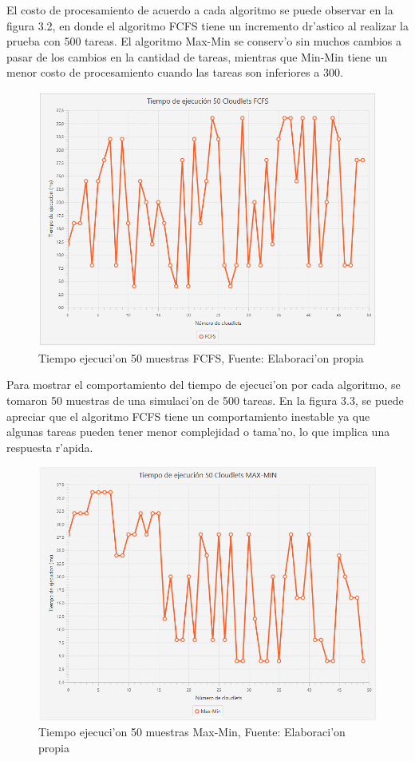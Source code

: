 \newpage
El costo de procesamiento de acuerdo a cada algoritmo se puede observar en la figura 3.2, en donde el algoritmo FCFS tiene un incremento dr'astico al realizar la prueba con 500 tareas. El algoritmo Max-Min se conserv'o sin muchos cambios a pasar de los cambios en la cantidad de tareas, mientras que Min-Min tiene un menor costo de procesamiento cuando las tareas son inferiores a 300.

\begin{figure}
	\caption{Tiempo ejecuci'on 50 muestras FCFS, Fuente: Elaboraci'on propia}
	\centering
	\includegraphics[scale=0.5]{media/fcfs}
\end{figure}

\bigskip
Para mostrar el comportamiento del tiempo de ejecuci'on por cada algoritmo, se tomaron 50 muestras de una simulaci'on de 500 tareas. En la figura 3.3, se puede apreciar que el algoritmo FCFS tiene un comportamiento inestable ya que algunas tareas pueden tener menor complejidad o tama'no, lo que implica una respuesta r'apida.

\begin{figure}
	\caption{Tiempo ejecuci'on 50 muestras Max-Min, Fuente: Elaboraci'on propia}
	\centering
	\includegraphics[scale=0.5]{media/max-min}
\end{figure}

